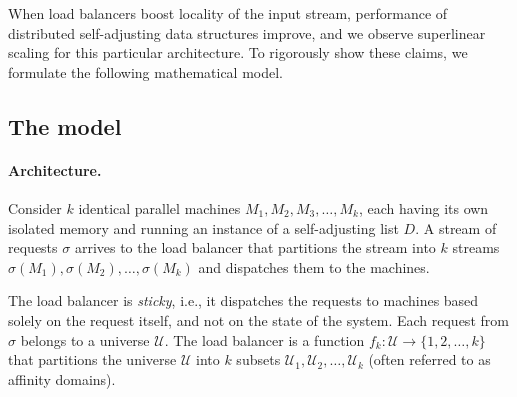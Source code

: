 When load balancers boost locality of the input stream, performance of distributed self-adjusting data structures improve, and we observe superlinear scaling for this particular architecture. 
To rigorously show these claims, we formulate the following mathematical model.






\subsection{The model}
\label{sec:model}

\paragraph{Architecture.}

Consider $k$ identical parallel machines $M_1, M_2, M_3, \ldots, M_k$, each having its own isolated memory and running an instance of a self-adjusting list $D$. A stream of requests $\sigma$ arrives to the load balancer that partitions the stream into $k$ streams $\sigma(M_1), \sigma(M_2), \ldots, \sigma(M_k)$ and dispatches them to the machines.

The load balancer is \emph{sticky}, i.e., it dispatches the requests to machines based solely on the request itself, and not on the state of the system.
Each request from $\sigma$ belongs to a universe $\mathcal{U}$. 
The load balancer is a function $f_k : \mathcal{U} \to \{1, 2, \ldots, k\}$ that partitions the universe $\mathcal{U}$ into $k$ subsets $\mathcal{U}_1, \mathcal{U}_2, \ldots, \mathcal{U}_k$ (often referred to as affinity domains).

